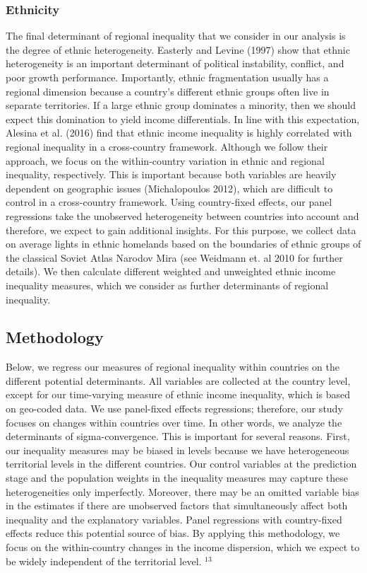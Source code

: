 \documentclass[10pt]{article}
\begin{document}
\subsubsection{Ethnicity}
The final determinant of regional inequality that we consider in our analysis is the degree of ethnic heterogeneity. Easterly and Levine (1997) show that ethnic heterogeneity is an important determinant of political instability, conflict, and poor growth performance. Importantly, ethnic fragmentation usually has a regional dimension because a country's different ethnic groups often live in separate territories. If a large ethnic group dominates a minority, then we should expect this domination to yield income differentials. In line with this expectation, Alesina et al. (2016) find that ethnic income inequality is highly correlated with regional inequality in a cross-country framework. Although we follow their approach, we focus on the within-country variation in ethnic and regional inequality, respectively. This is important because both variables are heavily dependent on geographic issues (Michalopoulos 2012), which are difficult to control in a cross-country framework. Using country-fixed effects, our panel regressions take the unobserved heterogeneity between countries into account and therefore, we expect to gain additional insights. For this purpose, we collect data on average lights in ethnic homelands based on the boundaries of ethnic groups of the classical Soviet Atlas Narodov Mira (see Weidmann et. al 2010 for further details). We then calculate different weighted and unweighted ethnic income inequality measures, which we consider as further determinants of regional inequality.

\subsection{Methodology}
Below, we regress our measures of regional inequality within countries on the different potential determinants. All variables are collected at the country level, except for our time-varying measure of ethnic income inequality, which is based on geo-coded data. We use panel-fixed effects regressions; therefore, our study focuses on changes within countries over time. In other words, we analyze the determinants of sigma-convergence. This is important for several reasons. First, our inequality measures may be biased in levels because we have heterogeneous territorial levels in the different countries. Our control variables at the prediction stage and the population weights in the inequality measures may capture these heterogeneities only imperfectly. Moreover, there may be an omitted variable bias in the estimates if there are unobserved factors that simultaneously affect both inequality and the explanatory variables. Panel regressions with country-fixed effects reduce this potential source of bias. By applying this methodology, we focus on the within-country changes in the income dispersion, which we expect to be widely independent of the territorial level. ${ }^{13}$
\end{document}
